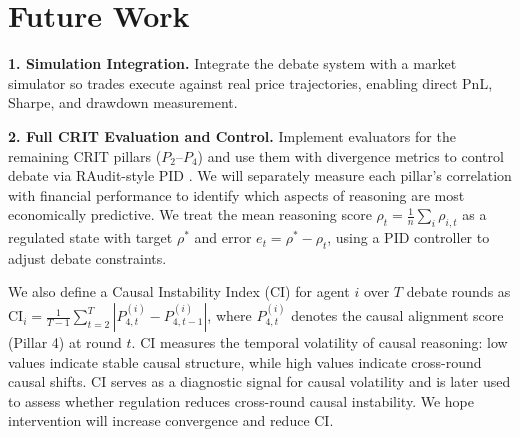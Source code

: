 \documentclass{article}
\begin{document}
\vspace{-6pt}
\section{Future Work}

\textbf{1. Simulation Integration.}
Integrate the debate system with a market simulator so trades execute against real price trajectories, enabling direct PnL, Sharpe, and drawdown measurement.

\textbf{2. Full CRIT Evaluation and Control.}
Implement evaluators for the remaining CRIT pillars ($P_2$--$P_4$) and use them with divergence metrics to control debate via RAudit-style \citep{raudit} PID \citep{Tore}. We will separately measure each pillar's correlation with financial performance to identify which aspects of reasoning are most economically predictive. We treat the mean reasoning score $\rho_t = \frac{1}{n}\sum_i \rho_{i,t}$ as a regulated state with target $\rho^*$ and error $e_t = \rho^* - \rho_t$, using a PID controller to adjust debate constraints. 

We also define a Causal Instability Index (CI) for agent $i$ over $T$ debate rounds as
$
\text{CI}_i
=
\frac{1}{T-1}
\sum_{t=2}^{T}
\left|
P_{4,t}^{(i)} - P_{4,t-1}^{(i)}
\right|$,
where $P_{4,t}^{(i)}$ denotes the causal alignment score (Pillar 4) at round $t$. 
CI measures the temporal volatility of causal reasoning: low values indicate 
stable causal structure, while high values indicate cross-round causal shifts. CI serves as a diagnostic signal for causal volatility and is later used to assess whether regulation reduces cross-round causal instability. We hope intervention will increase convergence and reduce CI. 


\end{document}
